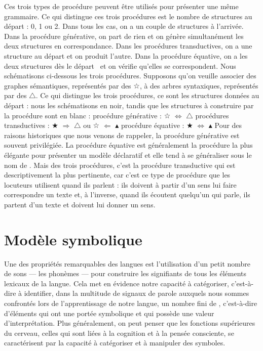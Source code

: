 {    Ces trois types de procédure peuvent être utilisés pour présenter une même grammaire. Ce qui distingue ces trois procédures est le nombre de structures au départ : 0, 1 ou 2. Dans tous les cas, on a un couple de structures à l’arrivée. Dans la procédure générative, on part de rien et on génère simultanément les deux structures en correspondance. Dans les procédures transductives, on a une structure au départ et on produit l’autre. Dans la procédure équative, on a les deux structures dès le départ~ et on vérifie qu’elles se correspondent. Nous schématisons ci-dessous les trois procédures. Supposons qu’on veuille associer des graphes sémantiques, représentés par des \textrm{☆}, à des arbres syntaxiques, représentés par des \textrm{${\bigtriangleup}$}. Ce qui distingue les trois procédures, ce sont les structures données au départ : nous les schématisons en noir, tandis que les structures à construire par la procédure sont en blanc :
    \ea
        procédure générative :    \textrm{☆ ${\Leftrightarrow}$} \textrm{${\bigtriangleup}$}
    \z
    \ea
        procédures transductives :    \textrm{★} \textrm{${\Rightarrow}$} \textrm{${\bigtriangleup}$  ou ☆} \textrm{${\Leftarrow}$} \textrm{${\blacktriangle}$}
    \z
    \ea
        procédure équative :    \textrm{★} \textrm{${\Leftrightarrow}$} \textrm{${\blacktriangle}$}
    \z
    Pour des raisons historiques que nous venons de rappeler, la procédure générative est souvent privilégiée. La procédure équative est généralement la procédure la plus élégante pour présenter un modèle déclaratif et elle tend à se généraliser sous le nom de . Mais des trois procédures, c’est la procédure transductive qui est descriptivement la plus pertinente, car c’est ce type de procédure que les locuteurs utilisent quand ils parlent : ils doivent à partir d’un sens lui faire correspondre un texte et, à l’inverse, quand ils écoutent quelqu’un qui parle, ils partent d’un texte et doivent lui donner un sens.
}
\section{Modèle symbolique}\label{sec:1.3.6}

Une des propriétés remarquables des langues est l’utilisation d’un petit nombre de sons — les phonèmes — pour construire les signifiants de tous les éléments lexicaux de la langue. Cela met en évidence notre capacité à catégoriser, c’est-à-dire à identifier, dans la multitude de signaux de parole auxquels nous sommes confrontés lors de l’apprentissage de notre langue, un nombre fini de , c’est-à-dire d’éléments qui ont une portée symbolique et qui possède une valeur d’interprétation. Plus généralement, on peut penser que les fonctions supérieures du cerveau, celles qui sont liées à la cognition et à la pensée consciente, se caractérisent par la capacité à catégoriser et à manipuler des symboles.

